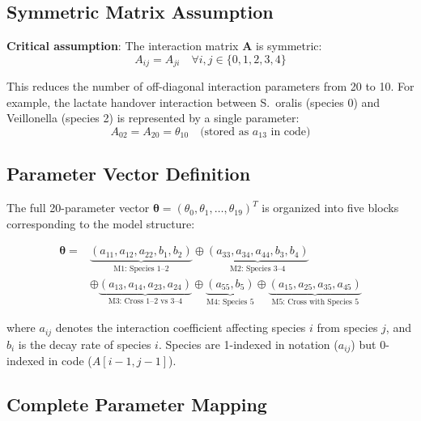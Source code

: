 \documentclass[11pt,a4paper]{article}
\begin{document}
\subsection{Symmetric Matrix Assumption}

\textbf{Critical assumption}: The interaction matrix $\mathbf{A}$ is symmetric:
\begin{equation}
A_{ij} = A_{ji} \quad \forall i, j \in \{0, 1, 2, 3, 4\}
\end{equation}

This reduces the number of off-diagonal interaction parameters from 20 to 10. For example, the lactate handover interaction between S.~oralis (species 0) and Veillonella (species 2) is represented by a single parameter:
\begin{equation}
A_{02} = A_{20} = \theta_{10} \quad \text{(stored as } a_{13} \text{ in code)}
\end{equation}

\subsection{Parameter Vector Definition}

The full 20-parameter vector $\boldsymbol{\theta} = (\theta_0, \theta_1, \ldots, \theta_{19})^T$ is organized into five blocks corresponding to the model structure:

\begin{equation}
\begin{split}
\boldsymbol{\theta} = & \underbrace{(a_{11}, a_{12}, a_{22}, b_1, b_2)}_{\text{M1: Species 1--2}}
\oplus \underbrace{(a_{33}, a_{34}, a_{44}, b_3, b_4)}_{\text{M2: Species 3--4}} \\
& \oplus \underbrace{(a_{13}, a_{14}, a_{23}, a_{24})}_{\text{M3: Cross 1--2 vs 3--4}}
\oplus \underbrace{(a_{55}, b_5)}_{\text{M4: Species 5}}
\oplus \underbrace{(a_{15}, a_{25}, a_{35}, a_{45})}_{\text{M5: Cross with Species 5}}
\end{split}
\end{equation}

\noindent where $a_{ij}$ denotes the interaction coefficient affecting species $i$ from species $j$, and $b_i$ is the decay rate of species $i$. Species are 1-indexed in notation ($a_{ij}$) but 0-indexed in code ($A[i-1,j-1]$).

\subsection{Complete Parameter Mapping}
\end{document}
